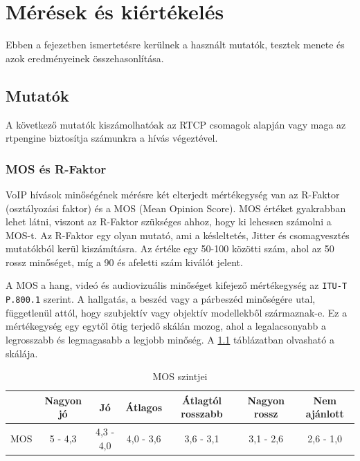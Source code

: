 \chapter{Mérések és kiértékelés}

Ebben a fejezetben ismertetésre kerülnek a használt mutatók, tesztek menete és
azok eredményeinek összehasonlítása.

\section{Mutatók}

A következő mutatók kiszámolhatóak az RTCP csomagok alapján vagy maga az rtpengine
biztosítja számunkra a hívás végeztével.

\subsection{MOS és R-Faktor}

VoIP hívások minőségének mérésre két elterjedt mértékegység van az R-Faktor (osztályozási 
faktor) és a MOS (Mean Opinion Score). MOS értéket gyakrabban lehet látni, viszont az 
R-Faktor szükséges ahhoz, hogy ki lehessen számolni a MOS-t. Az R-Faktor egy olyan 
mutató, ami a késleltetés, Jitter és csomagvesztés mutatókból kerül kiszámításra. Az 
értéke egy 50-100 közötti szám, ahol az 50 rossz minőséget, míg a 90 és afeletti szám 
kiválót jelent. 

A MOS a hang, videó és audiovizuális minőséget kifejező mértékegység az 
\texttt{ITU-T P.800.1} szerint. A hallgatás, a beszéd vagy a párbeszéd minőségére utal, 
függetlenül attól, hogy szubjektív vagy objektív modellekből származnak-e. Ez a
mértékegység egy egytől ötig terjedő skálán mozog, ahol a legalacsonyabb a legrosszabb
és legmagasabb a legjobb minőség. A \ref{tab:mosValues} táblázatban olvasható a skálája. 

\begin{table}[ht]
	\footnotesize
	\centering
	\begin{tabular}{l c c c c c c}
		\toprule
		 & Nagyon jó & Jó & Átlagos & Átlagtól rosszabb & Nagyon rossz & Nem ajánlott\\
		\midrule
		MOS & 5 - 4,3 & 4,3 - 4,0 & 4,0 - 3,6 & 3,6 - 3,1 & 3,1 - 2,6 & 2,6 - 1,0\\
		\bottomrule
	\end{tabular}
	\caption{MOS szintjei}
	\label{tab:mosValues}
\end{table}

